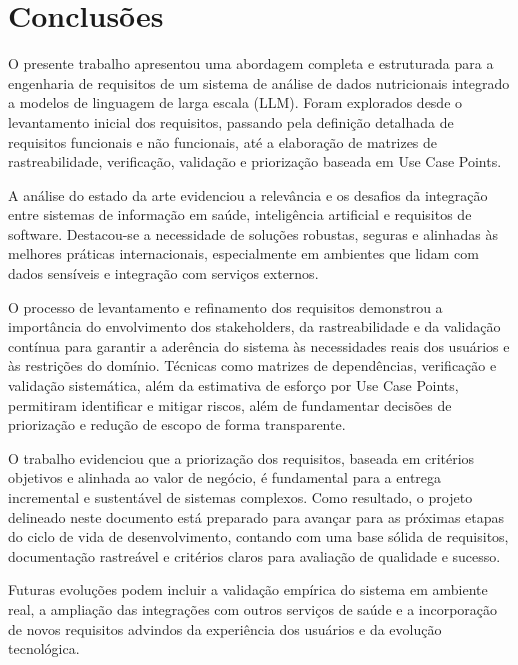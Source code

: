 \chapter{Conclusões}\label{cap:10-conclusoes}

O presente trabalho apresentou uma abordagem completa e estruturada para a engenharia de requisitos de um sistema de análise de dados nutricionais integrado a modelos de linguagem de larga escala (LLM). Foram explorados desde o levantamento inicial dos requisitos, passando pela definição detalhada de requisitos funcionais e não funcionais, até a elaboração de matrizes de rastreabilidade, verificação, validação e priorização baseada em Use Case Points.

A análise do estado da arte evidenciou a relevância e os desafios da integração entre sistemas de informação em saúde, inteligência artificial e requisitos de software. Destacou-se a necessidade de soluções robustas, seguras e alinhadas às melhores práticas internacionais, especialmente em ambientes que lidam com dados sensíveis e integração com serviços externos.

O processo de levantamento e refinamento dos requisitos demonstrou a importância do envolvimento dos stakeholders, da rastreabilidade e da validação contínua para garantir a aderência do sistema às necessidades reais dos usuários e às restrições do domínio. Técnicas como matrizes de dependências, verificação e validação sistemática, além da estimativa de esforço por Use Case Points, permitiram identificar e mitigar riscos, além de fundamentar decisões de priorização e redução de escopo de forma transparente.

O trabalho evidenciou que a priorização dos requisitos, baseada em critérios objetivos e alinhada ao valor de negócio, é fundamental para a entrega incremental e sustentável de sistemas complexos. Como resultado, o projeto delineado neste documento está preparado para avançar para as próximas etapas do ciclo de vida de desenvolvimento, contando com uma base sólida de requisitos, documentação rastreável e critérios claros para avaliação de qualidade e sucesso.

Futuras evoluções podem incluir a validação empírica do sistema em ambiente real, a ampliação das integrações com outros serviços de saúde e a incorporação de novos requisitos advindos da experiência dos usuários e da evolução tecnológica.
